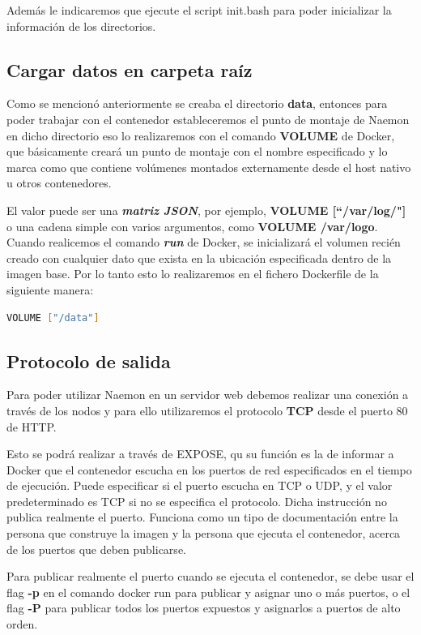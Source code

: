 Además le indicaremos que ejecute el script init.bash para poder inicializar la información de los directorios.

\subsection{Cargar datos en carpeta raíz}
Como se mencionó anteriormente se creaba el directorio \textbf{data}, entonces para poder trabajar con el contenedor estableceremos el punto de montaje de Naemon en dicho directorio eso lo realizaremos con el comando \textbf{VOLUME} de Docker, que básicamente creará un punto de montaje con el nombre especificado y lo marca como que contiene volúmenes montados externamente desde el host nativo u otros contenedores.

 El valor puede ser una \textbf{\textit{matriz JSON}}, por ejemplo,\textbf{ VOLUME [``/var/log/"]} o una cadena simple con varios argumentos, como \textbf{VOLUME /var/logo}.
Cuando realicemos el comando \textbf{\textit{run}} de Docker, se inicializará el volumen recién creado con cualquier dato que exista en la ubicación especificada dentro de la imagen base.
Por lo tanto esto lo realizaremos en el fichero Dockerfile de la siguiente manera:
\begin{lstlisting}[language=bash]
VOLUME ["/data"]
\end{lstlisting}
\subsection{Protocolo de salida}
Para poder utilizar Naemon en un servidor web debemos realizar una conexión a través de los nodos y para ello utilizaremos el protocolo \textbf{TCP} desde el puerto 80 de HTTP.

Esto se podrá realizar a través de EXPOSE, qu su función es la de informar a Docker que el contenedor escucha en los puertos de red especificados en el tiempo de ejecución. Puede especificar si el puerto escucha en TCP o UDP, y el valor predeterminado es TCP si no se especifica el protocolo.
\newpage
Dicha instrucción no publica realmente el puerto. Funciona como un tipo de documentación entre la persona que construye la imagen y la persona que ejecuta el contenedor, acerca de los puertos que deben publicarse.

Para publicar realmente el puerto cuando se ejecuta el contenedor, se debe usar el flag \textbf{-p} en el comando docker run para publicar y asignar uno o más puertos, o el flag \textbf{-P} para publicar todos los puertos expuestos y asignarlos a puertos de alto orden.

